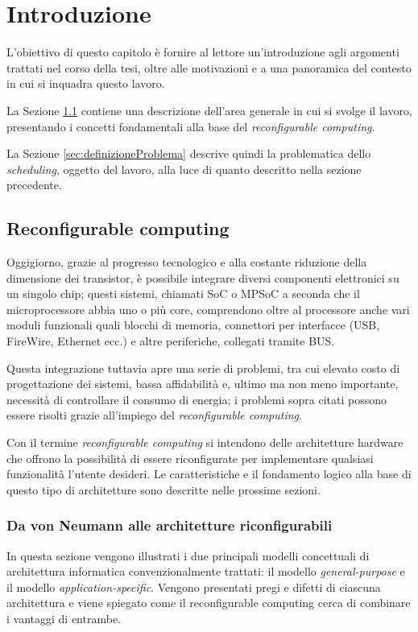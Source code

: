 \chapter{Introduzione}
\label{chap:intro}
\vspace{1cm}
L'obiettivo di questo capitolo è fornire al lettore un'introduzione agli argomenti 
trattati nel corso della tesi, oltre alle motivazioni e a una panoramica del contesto in 
cui si inquadra questo lavoro.

La Sezione \ref{sec:reconfComp} contiene una descrizione dell'area generale in cui si 
svolge il lavoro, presentando i concetti fondamentali alla base del \emph{reconfigurable 
computing}.

La Sezione \ref{sec:definizioneProblema} descrive quindi la problematica dello 
\emph{scheduling}, oggetto del lavoro, alla luce di quanto descritto nella sezione 
precedente.


\section{Reconfigurable computing}
\label{sec:reconfComp}
Oggigiorno, grazie al progresso tecnologico e alla costante riduzione della dimensione 
dei transistor, è possibile integrare diversi componenti elettronici su un singolo chip; 
questi sistemi, chiamati \ac{SoC} \cite{SoCBook} o \ac{MPSoC} \cite{MPSoCBook} a seconda
che il microprocessore abbia  uno o più core, comprendono oltre al processore anche vari
moduli funzionali quali blocchi di memoria, connettori per interfacce (USB, FireWire,
Ethernet ecc.) e altre periferiche, collegati tramite BUS.

Questa integrazione tuttavia apre una serie di problemi, tra cui elevato costo di 
progettazione dei sistemi, bassa affidabilità e, ultimo ma non meno importante,
necessità di controllare il consumo di energia; i problemi sopra citati possono
essere risolti grazie all'impiego del \emph{reconfigurable computing}.

Con il termine \emph{reconfigurable computing} si intendono delle architetture hardware che 
offrono la possibilità di essere riconfigurate per implementare qualsiasi funzionalità 
l'utente desideri. Le caratteristiche e il fondamento logico alla base di questo tipo di 
architetture sono descritte nelle prossime sezioni.

\subsection{Da von Neumann alle architetture riconfigurabili}
\label{subsec:cambioParadigma}
In questa sezione vengono illustrati i due principali modelli concettuali di architettura
informatica convenzionalmente trattati: il modello \emph{general-purpose} e il modello
\emph{application-specific}. Vengono presentati pregi e difetti di ciascuna architettura
e viene spiegato come il reconfigurable computing cerca di combinare i vantaggi di
entrambe.

